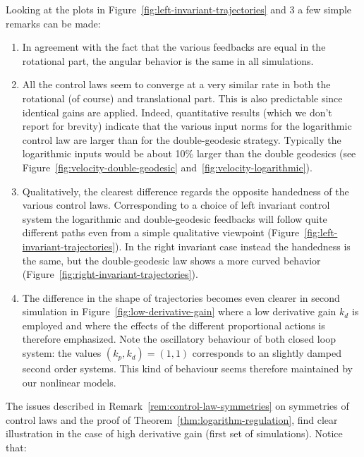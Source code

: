 \documentclass[11pt]{article}
\begin{document}
Looking at the plots in Figure~\ref{fig:left-invariant-trajectories} and 3 a few simple remarks can be made:
\begin{enumerate}
\item In agreement with the fact that the various feedbacks are equal in the rotational part, the angular behavior is the same in all simulations.
\item All the control laws seem to converge at a very similar rate in both the rotational (of course) and translational part. This is also predictable since identical gains are applied. Indeed, quantitative results (which we don't report for brevity) indicate that the various input norms for the logarithmic control law are larger than for the double-geodesic strategy. Typically the logarithmic inputs would be about 10\% larger than the double geodesics (see Figure~\ref{fig:velocity-double-geodesic} and~\ref{fig:velocity-logarithmic}).
\item Qualitatively, the clearest difference regards the opposite handedness of the various control laws. Corresponding to a choice of left invariant control system the logarithmic and double-geodesic feedbacks will follow quite different paths even from a simple qualitative viewpoint (Figure~\ref{fig:left-invariant-trajectories}). In the right invariant case instead the handedness is the same, but the double-geodesic law shows a more curved behavior (Figure~\ref{fig:right-invariant-trajectories}).
\item The difference in the shape of trajectories becomes even clearer in second simulation in Figure~\ref{fig:low-derivative-gain} where a low derivative gain $k_d$ is employed and where the effects of the different proportional actions is therefore emphasized. Note the oscillatory behaviour of both closed loop system: the values $(k_p,k_d)=(1,1)$ corresponds to an slightly damped second order systems. This kind of behaviour seems therefore maintained by our nonlinear models.
\end{enumerate}
The issues described in Remark~\ref{rem:control-law-symmetries} on symmetries of control laws and the proof of Theorem~\ref{thm:logarithm-regulation}, find clear illustration in the case of high derivative gain (first set of simulations). Notice that:
\end{document}

